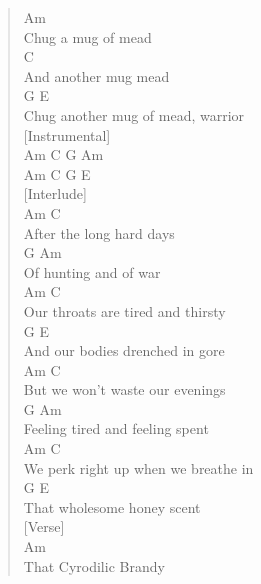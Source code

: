 \documentclass[11pt]{article}
\begin{document}
\begin{verse}
Am\\
Chug a mug of mead\\
\hspace*{5em}C\\
And another mug mead\\
\hspace*{6em}G                        E\\
Chug another mug of mead, warrior\\
\vspace*{1em}
[Instrumental]\\
Am C G Am\\
Am C G E\\
\vspace*{1em}
[Interlude]\\
\hspace*{2em}Am                C\\
After the long hard days\\
\hspace*{4em}G             Am\\
Of hunting and of war\\
\hspace*{5em}Am                    C\\
Our throats are tired and thirsty\\
\hspace*{8em}G                  E\\
And our bodies drenched in gore\\
\vspace*{1em}
\hspace*{7em}Am                 C\\
But we won't waste our evenings\\
\hspace*{8em}G                 Am\\
Feeling tired and feeling spent\\
\hspace*{3em}Am                 C\\
We perk right up when we breathe in\\
\hspace*{5em}G               E\\
That wholesome honey scent\\
\vspace*{1em}
[Verse]\\
\hspace*{5em}Am\\
That Cyrodilic Brandy\\

\end{verse}
\end{document}
